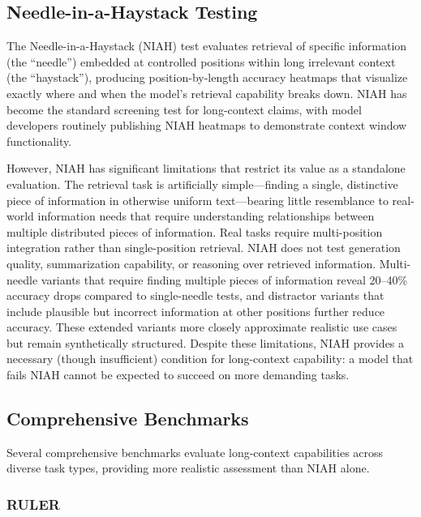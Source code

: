 \documentclass[11pt,letterpaper]{article}
\begin{document}
\subsection{Needle-in-a-Haystack Testing}

The Needle-in-a-Haystack (NIAH) test \cite{kamradt2023needle} evaluates retrieval of specific information (the ``needle'') embedded at controlled positions within long irrelevant context (the ``haystack''), producing position-by-length accuracy heatmaps that visualize exactly where and when the model's retrieval capability breaks down. NIAH has become the standard screening test for long-context claims, with model developers routinely publishing NIAH heatmaps to demonstrate context window functionality.

However, NIAH has significant limitations that restrict its value as a standalone evaluation. The retrieval task is artificially simple---finding a single, distinctive piece of information in otherwise uniform text---bearing little resemblance to real-world information needs that require understanding relationships between multiple distributed pieces of information. Real tasks require multi-position integration rather than single-position retrieval. NIAH does not test generation quality, summarization capability, or reasoning over retrieved information. Multi-needle variants that require finding multiple pieces of information reveal 20--40\% accuracy drops compared to single-needle tests, and distractor variants that include plausible but incorrect information at other positions further reduce accuracy. These extended variants more closely approximate realistic use cases but remain synthetically structured. Despite these limitations, NIAH provides a necessary (though insufficient) condition for long-context capability: a model that fails NIAH cannot be expected to succeed on more demanding tasks.

\subsection{Comprehensive Benchmarks}

Several comprehensive benchmarks evaluate long-context capabilities across diverse task types, providing more realistic assessment than NIAH alone.

\subsubsection{RULER}
\end{document}
